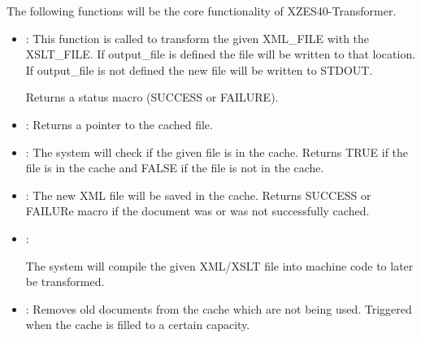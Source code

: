 The following functions will be the core functionality of XZES40-Transformer.

\begin {itemize}
    \item{
        :
        This function is called to transform the given XML\_FILE with the XSLT\_FILE.
        If output\_file is defined the file will be written to that location.
        If output\_file is not defined the new file will be written to STDOUT.

        Returns a status macro (SUCCESS or FAILURE).
    }
    \item{
        :
        Returns a pointer to the cached file.
    }
    \item{
        :
        The system will check if the given file is in the cache.
        Returns TRUE if the file is in the cache and FALSE if the file is not in the cache.
    }
    \item{
        :
        The new XML file will be saved in the cache.
        Returns SUCCESS or FAILURe macro if the document was or was not successfully cached.
    }
    \item{
        :

        The system will compile the given XML/XSLT file into machine code to later be transformed.
    }
    \item{
        :
        Removes old documents from the cache which are not being used.
        Triggered when the cache is filled to a certain capacity.
    }
\end{itemize}

